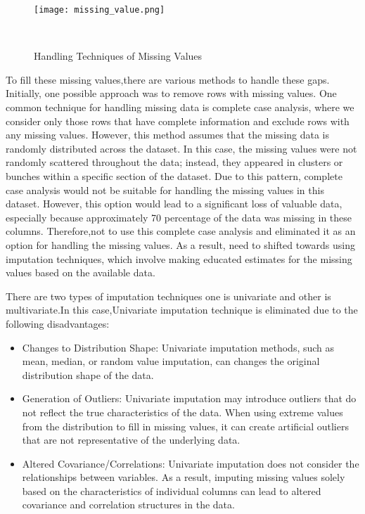 \documentclass[12pt, a4paper,oneside]{book}
\numberwithin{equation}{section}
\begin{document}
\begin{figure}[H]
\centerline{\texttt{[image: missing\_value.png]}}
\caption{Handling Techniques of Missing Values}
\label{fig:4.1}~\cite{ref8}
\end{figure}

To fill these missing values,there are various methods to handle these gaps. Initially, one possible approach was to remove rows with missing values. One common technique for handling missing data is complete case analysis, where we consider only those rows that have complete information and exclude rows with any missing values. However, this method assumes that the missing data is randomly distributed across the dataset. In this case, the missing values were not randomly scattered throughout the data; instead, they appeared in clusters or bunches within a specific section of the dataset. Due to this pattern, complete case analysis would not be suitable for handling the missing values in this dataset. However, this option would lead to a significant loss of valuable data, especially because approximately 70 percentage of the data was missing in these columns. Therefore,not to use this complete case analysis and eliminated it as an option for handling the missing values. As a result, need to shifted towards using imputation techniques, which involve making educated estimates for the missing values based on the available data.~\cite{ref8}
\newpage

There are two types of imputation techniques one is univariate and other is multivariate.In this case,Univariate imputation technique is eliminated due to the following disadvantages:

\begin{itemize}
    \item Changes to Distribution Shape: Univariate imputation methods, such as mean, median, or random value imputation, can changes the original distribution shape of the data. 
\end{itemize}


\begin{itemize}
    \item Generation of Outliers: Univariate imputation may introduce outliers that do not reflect the true characteristics of the data. When using extreme values from the distribution to fill in missing values, it can create artificial outliers that are not representative of the underlying data.
\end{itemize}

\begin{itemize}
    \item Altered Covariance/Correlations: Univariate imputation does not consider the relationships between variables. As a result, imputing missing values solely based on the characteristics of individual columns can lead to altered covariance and correlation structures in the data. 
\end{itemize}
\end{document}
